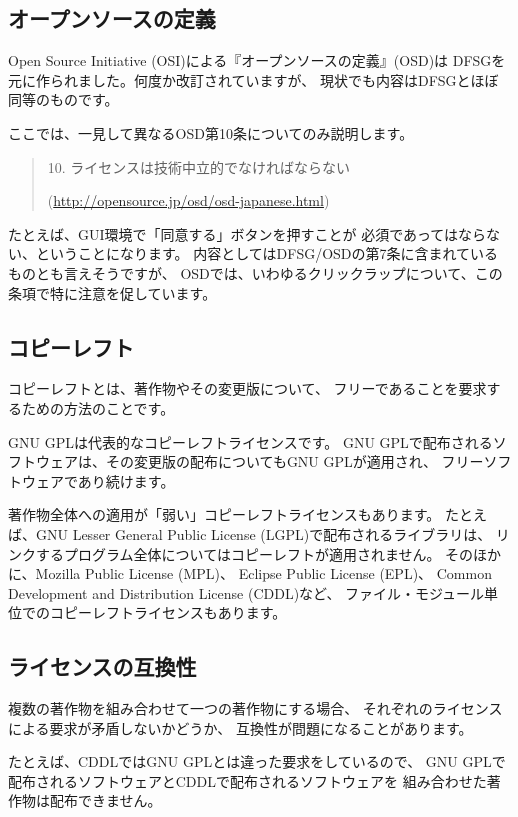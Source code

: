 \documentclass[mingoth,a4paper]{jsarticle}
\begin{document}
\subsection{オープンソースの定義}

Open Source Initiative (OSI)による『オープンソースの定義』(OSD)は
DFSGを元に作られました。何度か改訂されていますが、
現状でも内容はDFSGとほぼ同等のものです。

ここでは、一見して異なるOSD第10条についてのみ説明します。

\begin{quote}
10. ライセンスは技術中立的でなければならない

(\url{http://opensource.jp/osd/osd-japanese.html})
\end{quote}

たとえば、GUI環境で「同意する」ボタンを押すことが
必須であってはならない、ということになります。
内容としてはDFSG/OSDの第7条に含まれているものとも言えそうですが、
OSDでは、いわゆるクリックラップについて、この条項で特に注意を促しています。

\subsection{コピーレフト}

コピーレフトとは、著作物やその変更版について、
フリーであることを要求するための方法のことです。

GNU GPLは代表的なコピーレフトライセンスです。
GNU GPLで配布されるソフトウェアは、その変更版の配布についてもGNU GPLが適用され、
フリーソフトウェアであり続けます。

著作物全体への適用が「弱い」コピーレフトライセンスもあります。
たとえば、GNU Lesser General Public License (LGPL)で配布されるライブラリは、
リンクするプログラム全体についてはコピーレフトが適用されません。
そのほかに、Mozilla Public License (MPL)、
Eclipse Public License (EPL)、
Common Development and Distribution License (CDDL)など、
ファイル・モジュール単位でのコピーレフトライセンスもあります。

\subsection{ライセンスの互換性}

複数の著作物を組み合わせて一つの著作物にする場合、
それぞれのライセンスによる要求が矛盾しないかどうか、
互換性が問題になることがあります。

たとえば、CDDLではGNU GPLとは違った要求をしているので、
GNU GPLで配布されるソフトウェアとCDDLで配布されるソフトウェアを
組み合わせた著作物は配布できません。
\end{document}
